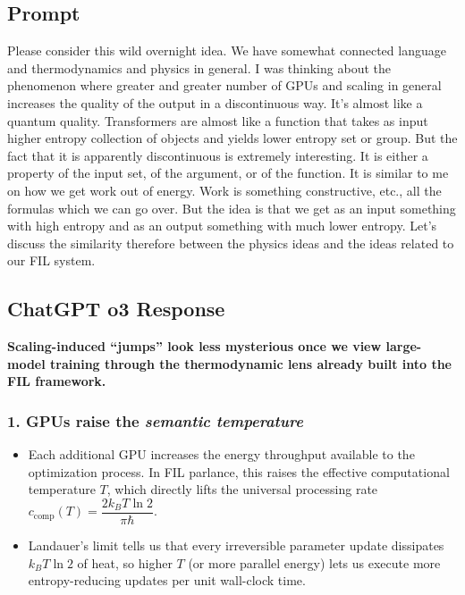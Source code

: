 \documentclass[11pt,letterpaper]{article}
\begin{document}
\subsection*{Prompt}
Please consider this wild overnight idea. We have somewhat connected language and thermodynamics and physics in general. I was thinking about the phenomenon where greater and greater number of GPUs and scaling in general increases the quality of the output in a discontinuous way. It's almost like a quantum quality. Transformers are almost like a function that takes as input higher entropy collection of objects and yields lower entropy set or group. But the fact that it is apparently discontinuous is extremely interesting. It is either a property of the input set, of the argument, or of the function. It is similar to me on how we get work out of energy. Work is something constructive, etc., all the formulas which we can go over. But the idea is that we get as an input something with high entropy and as an output something with much lower entropy. Let's discuss the similarity therefore between the physics ideas and the ideas related to our FIL system.

\subsection{ChatGPT o3 Response}
\label{subsec:q1_chatgpt}

\textbf{Scaling-induced “jumps” look less mysterious once we view large-model training through the thermodynamic lens already built into the FIL framework.}

\subsubsection*{1. GPUs raise the \emph{semantic temperature}}
\begin{itemize}
    \item Each additional GPU increases the energy throughput available to the optimization process. In FIL parlance, this raises the effective computational temperature $T$, which directly lifts the universal processing rate $c_{\text{comp}}(T) = \dfrac{2k_{B}T\ln 2}{\pi\hbar}$.
    \item Landauer’s limit tells us that every irreversible parameter update dissipates $k_{B}T\ln 2$ of heat, so higher $T$ (or more parallel energy) lets us execute more entropy-reducing updates per unit wall-clock time.
\end{itemize}
\end{document}
